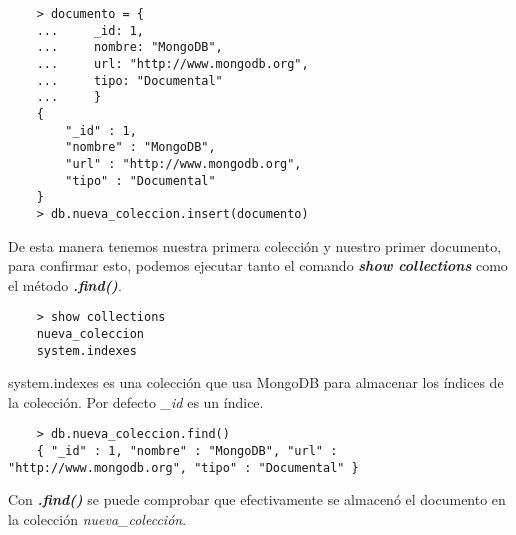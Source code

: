 \begin{lstlisting}
    > documento = {
    ...     _id: 1,
    ...     nombre: "MongoDB",
    ...     url: "http://www.mongodb.org",
    ...     tipo: "Documental"
    ...     }
    {
    	"_id" : 1,
    	"nombre" : "MongoDB",
    	"url" : "http://www.mongodb.org",
    	"tipo" : "Documental"
    }
    > db.nueva_coleccion.insert(documento)
\end{lstlisting}

De esta manera tenemos nuestra primera colecci\'on y nuestro primer documento, para confirmar esto, podemos ejecutar tanto el comando \textit{\textbf{show collections}} como el m\'etodo \textit{\textbf{.find()}}.

\begin{lstlisting}
    > show collections
    nueva_coleccion
    system.indexes
\end{lstlisting}

system.indexes es una colecci\'on que usa MongoDB para almacenar los \'indices de la colecci\'on. Por defecto \textit{\_id} es un \'indice.

\begin{lstlisting}
    > db.nueva_coleccion.find()
    { "_id" : 1, "nombre" : "MongoDB", "url" : "http://www.mongodb.org", "tipo" : "Documental" }
\end{lstlisting}

Con \textit{\textbf{.find()}} se puede comprobar que efectivamente se almacen\'o el documento en la colecci\'on \textit{nueva\_colecci\'on}.